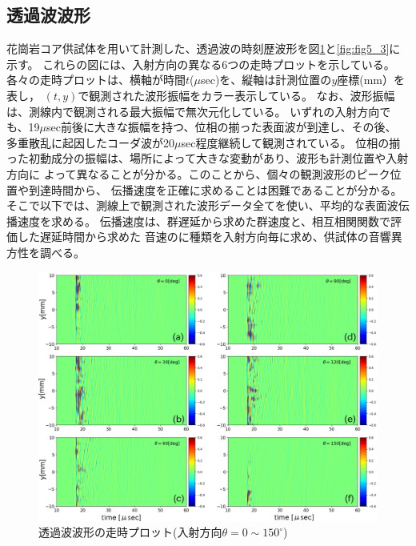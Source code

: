 \subsection{透過波波形}
花崗岩コア供試体を用いて計測した、透過波の時刻歴波形を図\ref{fig:fig5_2}と\ref{fig:fig5_3}に示す。
これらの図には、入射方向の異なる6つの走時プロットを示している。
各々の走時プロットは、横軸が時間$t$($\mu$sec)を、縦軸は計測位置の$y$座標(mm）を表し，
$(t,y)$で観測された波形振幅をカラー表示している。
なお、波形振幅は、測線内で観測される最大振幅で無次元化している。
いずれの入射方向でも、19$\mu$sec前後に大きな振幅を持つ、位相の揃った表面波が到達し、その後、
多重散乱に起因したコーダ波が20$\mu$sec程度継続して観測されている。
位相の揃った初動成分の振幅は、場所によって大きな変動があり、波形も計測位置や入射方向に
よって異なることが分かる。このことから、個々の観測波形のピーク位置や到達時間から、
伝播速度を正確に求めることは困難であることが分かる。
そこで以下では、測線上で観測された波形データ全てを使い、平均的な表面波伝播速度を求める。
伝播速度は、群遅延から求めた群速度と、相互相関関数で評価した遅延時間から求めた
音速のに種類を入射方向毎に求め、供試体の音響異方性を調べる。
\begin{figure}[h]
	\begin{center}
	\includegraphics[width=1.0\linewidth]{Figs/fig5_2.eps} 
	\end{center}
	\caption{
		透過波波形の走時プロット(入射方向$\theta=0\sim 150^{\circ}$)
	} 
	\label{fig:fig5_2}
\end{figure}
